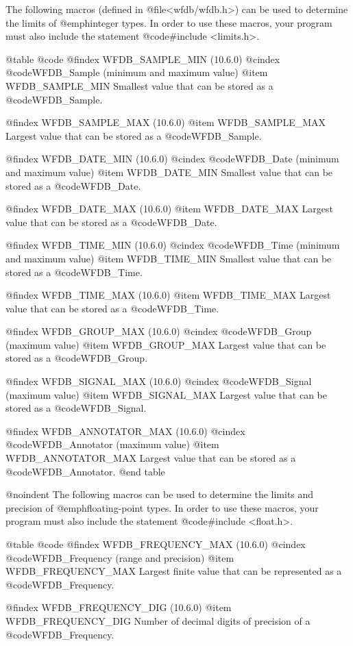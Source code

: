 {{{{{{{{{The following macros (defined in @file{<wfdb/wfdb.h>}) can be used to determine
the limits of @emph{integer} types.  In order to use these macros, your program
must also include the statement @code{#include <limits.h>}.

@table @code
@findex WFDB_SAMPLE_MIN (10.6.0)
@cindex @code{WFDB_Sample} (minimum and maximum value)
@item WFDB_SAMPLE_MIN
Smallest value that can be stored as a @code{WFDB_Sample}.

@findex WFDB_SAMPLE_MAX (10.6.0)
@item WFDB_SAMPLE_MAX
Largest value that can be stored as a @code{WFDB_Sample}.

@findex WFDB_DATE_MIN (10.6.0)
@cindex @code{WFDB_Date} (minimum and maximum value)
@item WFDB_DATE_MIN
Smallest value that can be stored as a @code{WFDB_Date}.

@findex WFDB_DATE_MAX (10.6.0)
@item WFDB_DATE_MAX
Largest value that can be stored as a @code{WFDB_Date}.

@findex WFDB_TIME_MIN (10.6.0)
@cindex @code{WFDB_Time} (minimum and maximum value)
@item WFDB_TIME_MIN
Smallest value that can be stored as a @code{WFDB_Time}.

@findex WFDB_TIME_MAX (10.6.0)
@item WFDB_TIME_MAX
Largest value that can be stored as a @code{WFDB_Time}.

@findex WFDB_GROUP_MAX (10.6.0)
@cindex @code{WFDB_Group} (maximum value)
@item WFDB_GROUP_MAX
Largest value that can be stored as a @code{WFDB_Group}.

@findex WFDB_SIGNAL_MAX (10.6.0)
@cindex @code{WFDB_Signal} (maximum value)
@item WFDB_SIGNAL_MAX
Largest value that can be stored as a @code{WFDB_Signal}.

@findex WFDB_ANNOTATOR_MAX (10.6.0)
@cindex @code{WFDB_Annotator} (maximum value)
@item WFDB_ANNOTATOR_MAX
Largest value that can be stored as a @code{WFDB_Annotator}.
@end table

@noindent
The following macros can be used to determine the limits and precision of
@emph{floating-point} types.  In order to use these macros, your program must
also include the statement @code{#include <float.h>}.

@table @code
@findex WFDB_FREQUENCY_MAX (10.6.0)
@cindex @code{WFDB_Frequency} (range and precision)
@item WFDB_FREQUENCY_MAX
Largest finite value that can be represented as a @code{WFDB_Frequency}.

@findex WFDB_FREQUENCY_DIG (10.6.0)
@item WFDB_FREQUENCY_DIG
Number of decimal digits of precision of a @code{WFDB_Frequency}.

}}}}}}}}}

